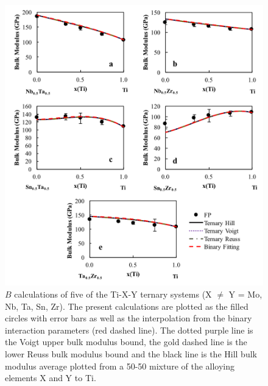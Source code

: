 \pagebreak
\begin{figure}[H]
	\centering
	\includegraphics[width=\textwidth]{Chapter-6/Figures/tixybulk2.png}
	\caption{$B$ calculations of five of the Ti-X-Y ternary systems (X $\neq$ Y = Mo, Nb, Ta, Sn, Zr). The present calculations are plotted as the filled circles with error bars as well as the interpolation from the binary interaction parameters (red dashed line). The dotted purple line is the Voigt upper bulk modulus bound, the gold dashed line is the lower Reuss bulk modulus bound and the black line is the Hill bulk modulus average plotted from a 50-50 mixture of the alloying elements X and Y to Ti.}
	\label{Ch6-figure:tixybulk2}
\end{figure}

